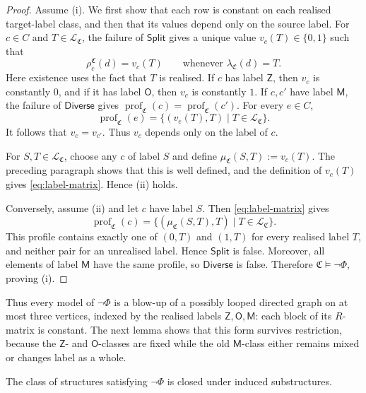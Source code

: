 \documentclass{lmcs}
\newcommand{\C}{\mathfrak{C}}
\newcommand{\Zt}{\mathsf{Z}}
\newcommand{\Ot}{\mathsf{O}}
\newcommand{\Mt}{\mathsf{M}}
\newcommand{\prof}{\operatorname{prof}}
\begin{document}
\begin{proof}
Assume \textup{(i)}.  We first show that each row is constant on each
realised target-label class, and then that its values depend only on the
source label.  For \(c\in C\) and \(T\in\mathcal L_{\C}\), the failure
of \(\mathsf{Split}\) gives a unique value \(v_c(T)\in\{0,1\}\) such that
\[
  \rho_c^{\C}(d)=v_c(T)
  \qquad\text{whenever }\lambda_{\C}(d)=T.
\]
Here existence uses the fact that \(T\) is realised.  If \(c\) has label
\(\Zt\), then \(v_c\) is constantly \(0\), and if it has label \(\Ot\), then
\(v_c\) is constantly \(1\).  If \(c,c'\) have label \(\Mt\), the failure of
\(\mathsf{Diverse}\) gives
\(\prof_{\C}(c)=\prof_{\C}(c')\).  For every \(e\in C\),
\[
  \prof_{\C}(e)
  =\{(v_e(T),T)\mid T\in\mathcal L_{\C}\}.
\]
It follows that \(v_c=v_{c'}\).  Thus \(v_c\) depends only on the label of
\(c\).

For \(S,T\in\mathcal L_{\C}\), choose any \(c\) of label \(S\) and define
\(\mu_{\C}(S,T):=v_c(T)\).  The preceding paragraph shows that this is
well defined, and the definition of \(v_c(T)\) gives
\eqref{eq:label-matrix}.  Hence \textup{(ii)} holds.

Conversely, assume \textup{(ii)} and let \(c\) have label \(S\).  Then
\eqref{eq:label-matrix} gives
\[
  \prof_{\C}(c)
  =\{(\mu_{\C}(S,T),T)\mid T\in\mathcal L_{\C}\}.
\]
This profile contains exactly one of \((0,T)\) and \((1,T)\) for every
realised label \(T\), and neither pair for an unrealised label.  Hence
\(\mathsf{Split}\) is false.  Moreover, all elements of label \(\Mt\) have
the same profile, so \(\mathsf{Diverse}\) is false.  Therefore
\(\C\models\neg\Phi\), proving \textup{(i)}.
\end{proof}

Thus every model of \(\neg\Phi\) is a blow-up of a possibly looped directed
graph on at most three vertices, indexed by the realised labels
\(\Zt,\Ot,\Mt\): each block of its \(R\)-matrix is constant.  The next lemma
shows that this form survives restriction, because the \(\Zt\)- and
\(\Ot\)-classes are fixed while the old \(\Mt\)-class either remains mixed or
changes label as a whole.

\begin{lem}
\label{lem:hereditary}
The class of structures satisfying \(\neg\Phi\) is closed under induced substructures.
\end{lem}
\end{document}
